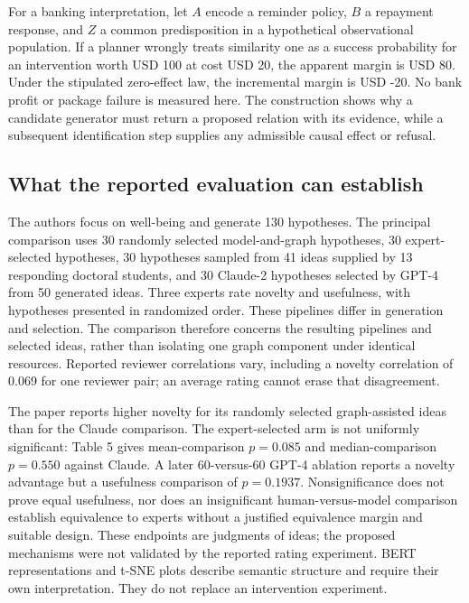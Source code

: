 For a banking interpretation, let $A$ encode a reminder policy, $B$ a repayment response, and $Z$ a common predisposition in a hypothetical observational population. If a planner wrongly treats similarity one as a success probability for an intervention worth USD 100 at cost USD 20, the apparent margin is USD 80. Under the stipulated zero-effect law, the incremental margin is USD -20. No bank profit or package failure is measured here. The construction shows why a candidate generator must return a proposed relation with its evidence, while a subsequent identification step supplies any admissible causal effect or refusal.

\subsection{What the reported evaluation can establish}
\label{exec20:hypothesis-evaluation}
The authors focus on well-being and generate 130 hypotheses. The principal comparison uses 30 randomly selected model-and-graph hypotheses, 30 expert-selected hypotheses, 30 hypotheses sampled from 41 ideas supplied by 13 responding doctoral students, and 30 Claude-2 hypotheses selected by GPT-4 from 50 generated ideas. Three experts rate novelty and usefulness, with hypotheses presented in randomized order. These pipelines differ in generation and selection. The comparison therefore concerns the resulting pipelines and selected ideas, rather than isolating one graph component under identical resources. Reported reviewer correlations vary, including a novelty correlation of 0.069 for one reviewer pair; an average rating cannot erase that disagreement.~\citep{exec20_hypothesis_generation}

The paper reports higher novelty for its randomly selected graph-assisted ideas than for the Claude comparison. The expert-selected arm is not uniformly significant: Table 5 gives mean-comparison $p=0.085$ and median-comparison $p=0.550$ against Claude. A later 60-versus-60 GPT-4 ablation reports a novelty advantage but a usefulness comparison of $p=0.1937$. Nonsignificance does not prove equal usefulness, nor does an insignificant human-versus-model comparison establish equivalence to experts without a justified equivalence margin and suitable design. These endpoints are judgments of ideas; the proposed mechanisms were not validated by the reported rating experiment. BERT representations and t-SNE plots describe semantic structure and require their own interpretation. They do not replace an intervention experiment.~\citep{exec20_hypothesis_generation}

